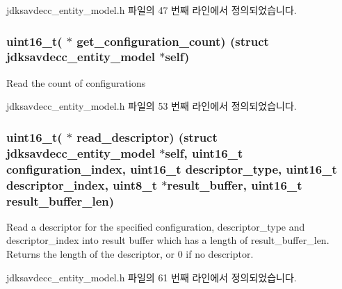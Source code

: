 jdksavdecc\+\_\+entity\+\_\+model.\+h 파일의 47 번째 라인에서 정의되었습니다.

\subsubsection[{\texorpdfstring{get\+\_\+configuration\+\_\+count}{get_configuration_count}}]{\setlength{\rightskip}{0pt plus 5cm}uint16\+\_\+t( $\ast$ get\+\_\+configuration\+\_\+count) (struct {\bf jdksavdecc\+\_\+entity\+\_\+model} $\ast$self)}\hypertarget{structjdksavdecc__entity__model_aeb06fced137cf5295ee0a10a3b26a057}{}\label{structjdksavdecc__entity__model_aeb06fced137cf5295ee0a10a3b26a057}
Read the count of configurations 

jdksavdecc\+\_\+entity\+\_\+model.\+h 파일의 53 번째 라인에서 정의되었습니다.

\subsubsection[{\texorpdfstring{read\+\_\+descriptor}{read_descriptor}}]{\setlength{\rightskip}{0pt plus 5cm}uint16\+\_\+t( $\ast$ read\+\_\+descriptor) (struct {\bf jdksavdecc\+\_\+entity\+\_\+model} $\ast$self, uint16\+\_\+t configuration\+\_\+index, uint16\+\_\+t descriptor\+\_\+type, uint16\+\_\+t descriptor\+\_\+index, {\bf uint8\+\_\+t} $\ast$result\+\_\+buffer, uint16\+\_\+t result\+\_\+buffer\+\_\+len)}\hypertarget{structjdksavdecc__entity__model_ab54813a88549a868a747fccd961dc422}{}\label{structjdksavdecc__entity__model_ab54813a88549a868a747fccd961dc422}
Read a descriptor for the specified configuration, descriptor\+\_\+type and descriptor\+\_\+index into result buffer which has a length of result\+\_\+buffer\+\_\+len. Returns the length of the descriptor, or 0 if no descriptor. 

jdksavdecc\+\_\+entity\+\_\+model.\+h 파일의 61 번째 라인에서 정의되었습니다.

